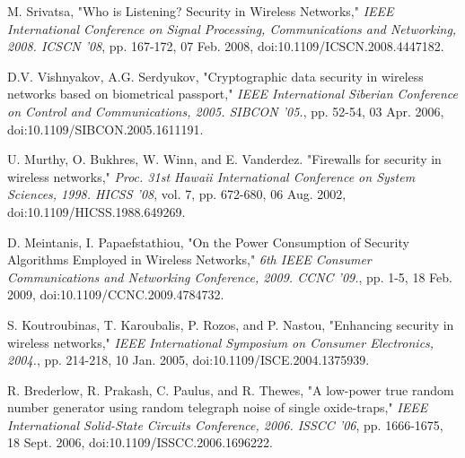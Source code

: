 \documentclass[11pt,onecolumn,cspaper,compsoc]{IEEEtran}
\begin{document}
\newpage
\begin{thebibliography}{1}


M. Srivatsa, "Who is Listening? Security in Wireless Networks," \emph{IEEE International Conference on Signal Processing, Communications and Networking, 2008. ICSCN '08}, pp. 167-172, 07 Feb. 2008, doi:10.1109/ICSCN.2008.4447182.

D.V. Vishnyakov, A.G. Serdyukov, "Cryptographic data security in wireless networks based on biometrical passport," \emph{IEEE International Siberian Conference on Control and Communications, 2005. SIBCON '05.}, pp. 52-54, 03 Apr. 2006, doi:10.1109/SIBCON.2005.1611191.

U. Murthy, O. Bukhres, W. Winn, and E. Vanderdez. "Firewalls for security in wireless networks," \emph{Proc. 31st Hawaii International Conference on System Sciences, 1998. HICSS '08}, vol. 7, pp. 672-680, 06 Aug. 2002, doi:10.1109/HICSS.1988.649269.

D. Meintanis, I. Papaefstathiou, "On the Power Consumption of Security Algorithms Employed in Wireless Networks," \emph{6th IEEE  Consumer Communications and Networking Conference, 2009. CCNC '09.}, pp. 1-5, 18 Feb. 2009, doi:10.1109/CCNC.2009.4784732.

S. Koutroubinas, T. Karoubalis, P. Rozos, and P. Nastou, "Enhancing security in wireless networks," \emph{IEEE International Symposium on Consumer Electronics, 2004.}, pp. 214-218, 10 Jan. 2005, doi:10.1109/ISCE.2004.1375939.

R. Brederlow, R. Prakash, C. Paulus, and R. Thewes, "A low-power true random number generator using random telegraph noise of single oxide-traps," \emph{IEEE International Solid-State Circuits Conference, 2006. ISSCC '06}, pp. 1666-1675, 18 Sept. 2006, doi:10.1109/ISSCC.2006.1696222.


\end{thebibliography}
\end{document}

